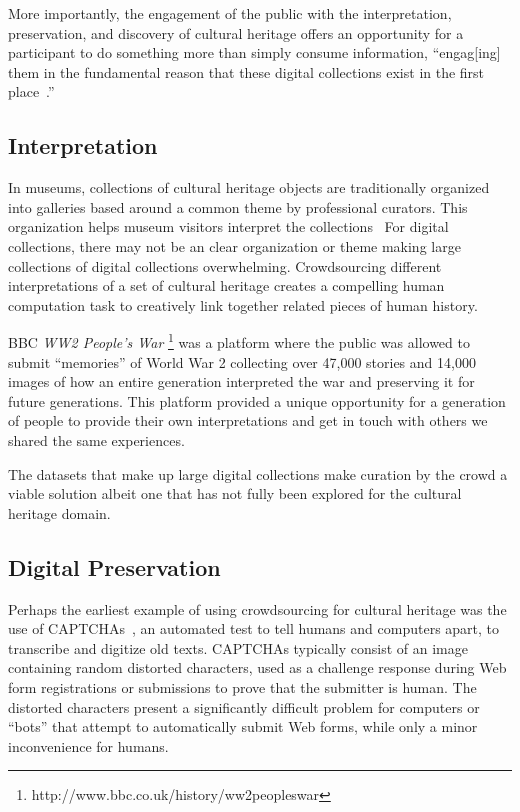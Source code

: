 \documentclass[10pt,twocolumn]{article}
\begin{document}
More importantly, the engagement of the public with the interpretation, 
preservation, and discovery of cultural heritage offers an opportunity for
a participant to do something more than simply consume information, ``engag[ing] 
them in the fundamental reason that these digital collections exist in the 
first place~\cite{Owens2013}.''


\subsection{Interpretation}
In museums, collections of cultural heritage objects are traditionally organized
into galleries based around a common theme by professional curators. This
organization helps museum visitors interpret the collections~\cite{Aletras2012}
For digital collections, there may not be an clear organization or theme making
large collections of digital collections overwhelming. Crowdsourcing different
interpretations of a set of cultural heritage creates a compelling human 
computation task to creatively link together related pieces of human history.

BBC \textit{WW2 People's War}
\footnote{http://www.bbc.co.uk/history/ww2peopleswar} was a platform
where the public was allowed to submit ``memories'' of World War 2 collecting 
over 47,000 stories and 14,000 images of how an entire generation 
interpreted the war and preserving it for future generations. This platform
provided a unique opportunity for a generation of people to provide their 
own interpretations and get in touch with others we shared the same 
experiences.

The datasets that make up large digital collections make curation by the crowd 
a viable solution albeit one that has not fully been explored for the cultural
heritage domain.


\subsection{Digital Preservation}
Perhaps the earliest example of using crowdsourcing for cultural heritage was
the use of CAPTCHAs~\cite{Ahn2003}, an automated test to tell humans and computers apart, to transcribe and digitize old texts. CAPTCHAs typically 
consist of an image containing random distorted characters, used as a challenge
response during Web form registrations or submissions to prove that the 
submitter is human. The distorted characters present a significantly 
difficult problem for computers or ``bots'' that attempt to automatically submit Web forms, while only a minor inconvenience for humans.
\end{document}
